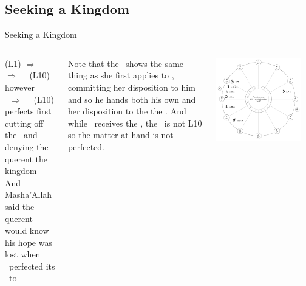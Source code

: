 \subsection{Seeking a Kingdom}
\begin{frame}[t]{Seeking a Kingdom}
\begin{columns}[T, onlytextwidth]
\Mercury\Retrograde (L1) $\Rightarrow$ \Conjunction\Sun\ $\Rightarrow$ \Sextile\ \Saturn\ (L10) \\
however \\
\Mars\ $\Rightarrow$ \Square\ \Saturn\ (L10) perfects first \\
cutting off the \Sun\ and denying the querent the kingdom \\
\vspace{0.25cm}
And Masha'Allah said the querent would know his hope was lost when \Mars\ perfected its \Square\ to \Saturn \\
\vspace{0.25cm}

Note that the \Moon\ shows the same thing as she first applies to \Mercury, committing her disposition to him and so he hands both his own and her disposition to the the \Sun. And
while  \Mercury\ receives the \Sun, the \Sun\ is not L10 so the matter at hand is not perfected. \\


\begin{center}
{\includegraphics[width=0.9\textwidth]{charts/50-chart-kingdom}} \\
\end{center}
\end{columns}
\end{frame}


